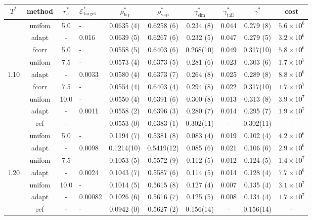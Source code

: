 \documentclass[aps,pre,preprint]{revtex4}
\begin{document}
\begin{table}
  \centering
  \begin{tabular*}{0.99\textwidth}{c|c|@{\extracolsep{\fill}}clcccccc}\hline\hline
    $T^\ast$ & \textrm{method} &$r^\ast_{c}$ & $\mathcal E^\ast_{\textrm{target}}$  & $\rho^\ast_{\textrm{liq}}$ & $\rho^\ast_{\textrm{vap}}$ & $\gamma^\ast_{\textrm{sim}}$ & $\gamma^\ast_{\textrm{tail}}$ & $\gamma^\ast$ & cost\\\hline
    & \textrm{unifom} & 5.0     & -       & 0.0635 (4) & 0.6258 (6) & 0.234 (8) & 0.044 & 0.279 (8) & $5.6\times 10^6$\\
    & \textrm{adapt}  & -       & 0.016   & 0.0639 (5) & 0.6267 (6) & 0.232 (5) & 0.047 & 0.279 (5) & $3.2\times 10^6$\\
    & \textrm{fcorr}  & 5.0     & -       & 0.0558 (5) & 0.6403 (6) & 0.268(10) & 0.049 & 0.317(10) & $5.8\times 10^6$\\\cline{2-10}
    & \textrm{unifom} & 7.5     & -       & 0.0573 (4) & 0.6373 (5) & 0.281 (6) & 0.023 & 0.303 (6) & $1.7\times 10^7$\\
1.10& \textrm{adapt}  & -       & 0.0033  & 0.0580 (4) & 0.6373 (7) & 0.264 (8) & 0.025 & 0.289 (8) & $8.8\times 10^6$\\
    & \textrm{fcorr}  & 7.5     & -       & 0.0554 (4) & 0.6403 (4) & 0.294 (8) & 0.022 & 0.317(10) & $1.7\times 10^7$\\\cline{2-10}
    & \textrm{unifom} & 10.0    & -       & 0.0550 (4) & 0.6391 (6) & 0.300 (8) & 0.013 & 0.313 (8) & $3.9\times 10^7$\\
    & \textrm{adapt}  & -       & 0.0011  & 0.0558 (2) & 0.6396 (3) & 0.280 (7) & 0.014 & 0.295 (7) & $1.9\times 10^7$\\
    & \textrm{ref}    & -       & -       & 0.0553 (0) & 0.6383 (1) & 0.302(11) & -     & 0.302(11) & - \\    \hline\hline
    & \textrm{unifom} & 5.0     & -       & 0.1194 (7) & 0.5381 (8) & 0.083 (4) & 0.019 & 0.102 (4) & $4.2\times 10^6$\\
    & \textrm{adapt}  & -       & 0.0098  & 0.1214(10) & 0.5419(12) & 0.085 (6) & 0.021 & 0.106 (6) & $2.9\times 10^6$\\
    & \textrm{unifom} & 7.5     & -       & 0.1053 (5) & 0.5572 (9) & 0.112 (5) & 0.012 & 0.124 (5) & $1.4\times 10^7$\\
1.20& \textrm{adapt}  & -       & 0.0024  & 0.1043 (7) & 0.5587 (6) & 0.114 (5) & 0.014 & 0.128 (4) & $7.7\times 10^6$\\
    & \textrm{unifom} &10.0     & -       & 0.1014 (5) & 0.5615 (8) & 0.127 (4) & 0.007 & 0.135 (4) & $3.1\times 10^7$\\
    & \textrm{adapt}  & -       & 0.00082 & 0.1026 (6) & 0.5616 (7) & 0.125 (5) & 0.008 & 0.134 (4) & $1.7\times 10^7$\\\
    & \textrm{ref}    & -       & -       & 0.0942 (0) & 0.5627 (2) & 0.156(14) & -     & 0.156(14) & - \\    \hline    \hline    
  \end{tabular*}
\end{table}



% 
\end{document}
